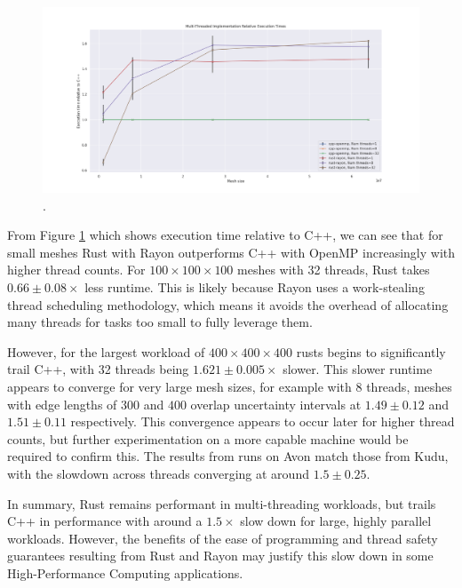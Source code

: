 \begin{figure}[H]
    \centering
    \includegraphics[width=\textwidth]{images/5_performance/parallelism/7_parallel_line_relative.png}
    \caption{.}
    \label{fig:7_parallel_line_relative}
\end{figure}

From Figure \ref{fig:7_parallel_line_relative} which shows execution time relative to C++, we can see that for small meshes Rust with Rayon outperforms C++ with OpenMP increasingly with higher thread counts. For $100 \times 100 \times 100$ meshes with 32 threads, Rust takes $0.66 \pm 0.08 \times$ less runtime. This is likely because Rayon uses a work-stealing thread scheduling methodology, which means it avoids the overhead of allocating many threads for tasks too small to fully leverage them.

However, for the largest workload of $400 \times 400 \times 400$ rusts begins to significantly trail C++, with 32 threads being $1.621 \pm 0.005 \times$ slower. This slower runtime appears to converge for very large mesh sizes, for example with 8 threads, meshes with edge lengths of $300$ and $400$ overlap uncertainty intervals at $1.49 \pm 0.12$ and $1.51 \pm 0.11$ respectively. This convergence appears to occur later for higher thread counts, but further experimentation on a more capable machine would be required to confirm this. The results from runs on Avon match those from Kudu, with the slowdown across threads converging at around $1.5 \pm 0.25$.

In summary, Rust remains performant in multi-threading workloads, but trails C++ in performance with around a $1.5 \times$ slow down for large, highly parallel workloads. However, the benefits of the ease of programming and thread safety guarantees resulting from Rust and Rayon may justify this slow down in some High-Performance Computing applications.

